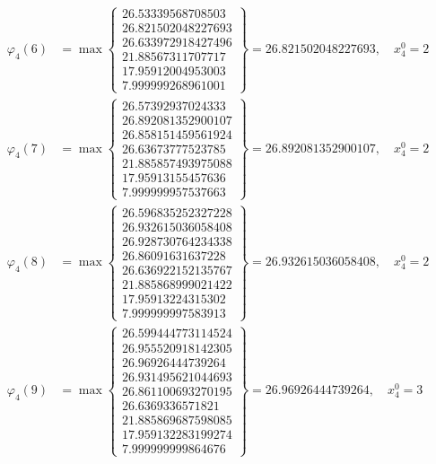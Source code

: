 \documentclass{article}
\begin{document}
\begin{align*}
  
\varphi_{4}(6) &= \max \left\{ \begin{array}{c}
26.53339568708503 \\
 26.821502048227693 \\
 26.633972918427496 \\
 21.88567311707717 \\
 17.95912004953003 \\
 7.999999268961001
\end{array} \right\} = 26.821502048227693, \quad x_{4}^0 = 2\\
  
  
  
  
\varphi_{4}(7) &= \max \left\{ \begin{array}{c}
26.57392937024333 \\
 26.892081352900107 \\
 26.858151459561924 \\
 26.63673777523785 \\
 21.885857493975088 \\
 17.95913155457636 \\
 7.999999957537663
\end{array} \right\} = 26.892081352900107, \quad x_{4}^0 = 2\\
  
  
  
  
\varphi_{4}(8) &= \max \left\{ \begin{array}{c}
26.596835252327228 \\
 26.932615036058408 \\
 26.928730764234338 \\
 26.86091631637228 \\
 26.636922152135767 \\
 21.885868999021422 \\
 17.95913224315302 \\
 7.999999997583913
\end{array} \right\} = 26.932615036058408, \quad x_{4}^0 = 2\\
  
  
  
  
\varphi_{4}(9) &= \max \left\{ \begin{array}{c}
26.599444773114524 \\
 26.955520918142305 \\
 26.96926444739264 \\
 26.931495621044693 \\
 26.861100693270195 \\
 26.6369336571821 \\
 21.885869687598085 \\
 17.959132283199274 \\
 7.999999999864676
\end{array} \right\} = 26.96926444739264, \quad x_{4}^0 = 3\\
  

\end{align*}
\end{document}
